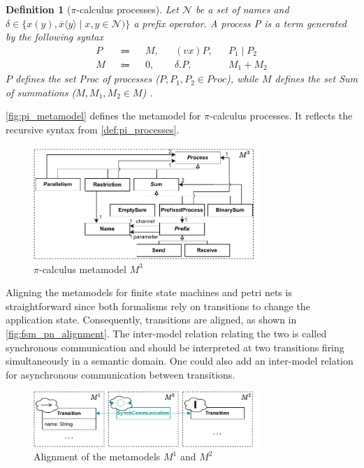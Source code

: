 \documentclass[conference]{IEEEtran}
\newtheorem{definition}{Definition}
\begin{document}
\begin{definition}[$\pi$-calculus processes] \label{def:pi_processes}
    Let $\mathcal{N}$ be a set of names and $\delta \in \{x(y),\overline{x}\langle y \rangle \mid x,y \in \mathcal{N})\}$ a prefix operator.
    A process P is a term generated by the following syntax
    \begin{align*}
        P && \Coloneqq && M, && (vx) P, && P_1 \mid P_2\\
        M && \Coloneqq && 0, && \delta.P, && M_1 + M_2
    \end{align*}
    $P$ defines the set \textit{Proc} of processes ($P, P_1, P_2 \in Proc$), while $M$ defines the set \textit{Sum} of summations ($M, M_1, M_2 \in M$) \cite{gadducciGraphRewritingPcalculus2007}.
\end{definition}

\autoref{fig:pi_metamodel} defines the metamodel for $\pi$-calculus processes.
It reflects the recursive syntax from \autoref{def:pi_processes}.

\begin{figure}[h]
    \centering
    \includegraphics[width=3.4in]{pi_metamodel}
    \caption{$\pi$-calculus metamodel $M^3$}
    \label{fig:pi_metamodel}
\end{figure}

Aligning the metamodels for finite state machines and petri nets is straightforward since both formalisms rely on transitions to change the application state.
Consequently, transitions are aligned, as shown in \autoref{fig:fsm_pn_alignment}.
The inter-model relation relating the two is called synchronous communication and should be interpreted at two transitions firing simultaneously in a semantic domain.
One could also add an inter-model relation for asynchronous communication between transitions.

\begin{figure}[h]
    \centering
    \includegraphics[width=3.4in]{fsm_pn_alignment}
    \caption{Alignment of the metamodels $M^1$ and $M^2$}
    \label{fig:fsm_pn_alignment}
\end{figure}
\end{document}
